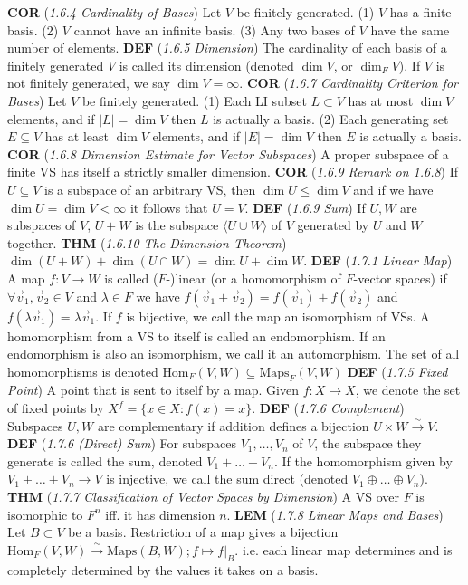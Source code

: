 \documentclass{article}
\newcommand{\wde}[1]{\textcolor{defc}{\textbf{DEF}} (\textcolor{namec}{\textit{#1}})}
\newcommand{\wl}[1]{\textcolor{lemc}{\textbf{LEM}} (\textcolor{namec}{\textit{#1}})}
\newcommand{\wc}[1]{\textcolor{corc}{\textbf{COR}} (\textcolor{namec}{\textit{#1}})}
\newcommand{\wt}[1]{\textcolor{thmc}{\textbf{THM}} (\textcolor{namec}{\textit{#1}})}
\newcommand{\Maps}[0]{\text{Maps}}
\newcommand{\Hom}[0]{\text{Hom}}
\newcommand{\iso}[0]{\stackrel{\sim}{\to}}
\begin{document}
\begin{multicols}{2}
  \wc{1.6.4 Cardinality of Bases} Let $V$ be finitely-generated.
  (1) $V$ has a finite basis.
  (2) $V$ cannot have an infinite basis.
  (3) Any two bases of $V$ have the same number of elements.
  \wde{1.6.5 Dimension} The cardinality of each basis of a finitely generated $V$ is called its dimension (denoted $\dim V$, or $\dim_{F}V$). If $V$ is not finitely generated, we say $\dim V = \infty$.
  \wc{1.6.7 Cardinality Criterion for Bases} Let $V$ be finitely generated.
  (1) Each LI subset $L \subset V$ has at most $\dim V$ elements, and if $|L| = \dim V$ then $L$ is actually a basis.
  (2) Each generating set $E \subseteq V$ has at least $\dim V$ elements, and if $|E| = \dim V$ then $E$ is actually a basis.
  \wc{1.6.8 Dimension Estimate for Vector Subspaces} A proper subspace of a finite VS has itself a strictly smaller dimension.
  \wc{1.6.9 Remark on 1.6.8} If $U \subseteq V$ is a subspace of an arbitrary VS, then $\dim U \le \dim V$ and if we have $\dim U = \dim V < \infty$ it follows that $U = V$.
  \wde{1.6.9 Sum} If $U,W$ are subspaces of $V$, $U + W$ is the subspace $\langle U \cup W \rangle$ of $V$ generated by $U$ and $W$ together.
  \wt{1.6.10 The Dimension Theorem} $\dim(U + W) + \dim(U \cap W) = \dim U + \dim W$.
  \wde{1.7.1 Linear Map} A map $f : V \to W$ is called ($F$-)linear (or a homomorphism of $F$-vector spaces) if $\forall \vec{v}_{1}, \vec{v}_{2} \in V$ and $\lambda \in F$ we have $f(\vec{v}_{1} + \vec{v}_{2}) = f(\vec{v}_{1}) + f(\vec{v}_{2})$ and $f(\lambda \vec{v}_{1}) = \lambda \vec{v}_{1}$. If $f$ is bijective, we call the map an isomorphism of VSs. A homomorphism from a VS to itself is called an endomorphism. If an endomorphism is also an isomorphism, we call it an automorphism. The set of all homomorphisms is denoted $\Hom_{F}(V,W) \subseteq \Maps_{F}(V,W)$
  \wde{1.7.5 Fixed Point} A point that is sent to itself by a map. Given $f : X \to X$, we denote the set of fixed points by $X^{f} = \{x \in X : f(x) = x\}$.
  \wde{1.7.6 Complement} Subspaces $U,W$ are complementary if addition defines a bijection $U \times W \iso V$.
  \wde{1.7.6 (Direct) Sum} For subspaces $V_{1}, \dots, V_{n}$ of $V$, the subspace they generate is called the sum, denoted $V_{1} + \dots + V_{n}$. If the homomorphism given by $V_{1} + \dots + V_{n} \to V$ is injective, we call the sum direct (denoted $V_{1} \oplus \dots \oplus V_{n}$).
  \wt{1.7.7 Classification of Vector Spaces by Dimension} A VS over $F$ is isomorphic to $F^{n}$ iff. it has dimension $n$.
  \wl{1.7.8 Linear Maps and Bases} Let $B \subset V$ be a basis. Restriction of a map gives a bijection $\Hom_{F}(V, W) \iso \Maps(B, W); f \mapsto f |_{B}$. i.e. each linear map determines and is completely determined by the values it takes on a basis.
\end{multicols}
\end{document}

